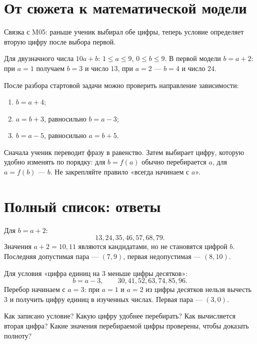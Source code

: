 \section{От сюжета к математической модели}

Связка с M05: раньше ученик выбирал обе цифры, теперь условие определяет
вторую цифру после выбора первой.

Для двузначного числа \(10a+b\): \(1\leq a\leq9\), \(0\leq b\leq9\).
В первой модели \(b=a+2\): при \(a=1\) получаем \(b=3\) и число \(13\), при
\(a=2\) --- \(b=4\) и число \(24\).

После разбора стартовой задачи можно проверить направление зависимости:
\begin{enumerate}
  \item \(b=a+4\);
  \item \(a=b+3\), равносильно \(b=a-3\);
  \item \(b=a-5\), равносильно \(a=b+5\).
\end{enumerate}

\begin{teacherbox}
  Сначала ученик переводит фразу в равенство. Затем выбирает цифру, которую
  удобно изменять по порядку: для \(b=f(a)\) обычно перебирается \(a\), для
  \(a=f(b)\) --- \(b\). Не закрепляйте правило «всегда начинаем с \(a\)».
\end{teacherbox}

\section{Полный список: ответы}

Для \(b=a+2\):
\[
  13,24,35,46,57,68,79.
\]
Значения \(a+2=10,11\) являются кандидатами, но не становятся цифрой \(b\).
Последняя допустимая пара --- \((7,9)\), первая недопустимая --- \((8,10)\).

Для условия «цифра единиц на \(3\) меньше цифры десятков»:
\[
  b=a-3, \qquad 30,41,52,63,74,85,96.
\]
Перебор начинаем с \(a=3\): при \(a=1\) и \(a=2\) из цифры десятков нельзя
вычесть \(3\) и получить цифру единиц в изученных числах. Первая пара ---
\((3,0)\).

\begin{teacherbox}
  Как записано условие? Какую цифру удобнее перебирать? Как вычисляется
  вторая цифра? Какие значения перебираемой цифры проверены, чтобы доказать
  полноту?
\end{teacherbox}

